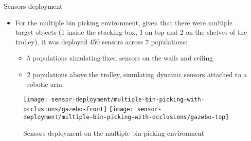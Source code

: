 \begin{frame}{Sensors deployment}
	\begin{itemize}
		\item For the multiple bin picking environment, given that there were multiple target objects (1 inside the stacking box, 1 on top and 2 on the shelves of the trolley), it was deployed 450 sensors across 7 populations:
		\begin{itemize}
			\item 5 populations simulating fixed sensors on the walls and ceiling
			\item 2 populations above the trolley, simulating dynamic sensors attached to a robotic arm
		\end{itemize}
	\end{itemize}
	\begin{figure}
		\centering
		\texttt{[image: sensor-deployment/multiple-bin-picking-with-occlusions/gazebo-front]}\hspace{2em}
		\texttt{[image: sensor-deployment/multiple-bin-picking-with-occlusions/gazebo-top]}
		\caption{Sensors deployment on the multiple bin picking environment}
	\end{figure}
\end{frame}
